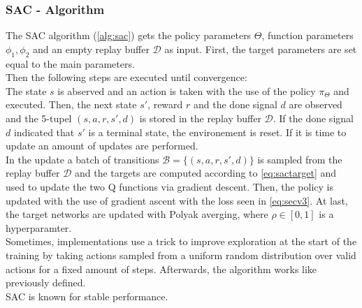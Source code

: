 \subsubsection{SAC - Algorithm}
The SAC algorithm (\cref{alg:sac}) gets the policy parameters $\Theta$, function parameters $\phi_1, \phi_2$ and an empty replay buffer $\mathcal{D}$ as input. First, the target parameters are set equal to the main parameters.\\
Then the following steps are executed until convergence:\\
The state $s$ is abserved and an action is taken with the use of the policy $\pi_{\Theta}$ and executed.
Then, the next state $s'$, reward $r$ and the done signal $d$ are observed and the 5-tupel $(s, a, r, s', d)$ is stored in the replay buffer $\mathcal{D}$. If the done signal $d$ indicated that $s'$ is a terminal state, the environement is reset.
If it is time to update an amount of updates are performed.\\
In the update a batch of transitions $\mathcal{B}= \{(s,a,r,s', d)\}$ is sampled from the replay buffer $\mathcal{D}$ and the targets are computed according to \cref{eq:sactarget} and used to update the two Q functions via gradient descent. Then, the policy is updated with the use of gradient ascent with the loss seen in \cref{eq:secv3}.
At last, the target networks are updated with Polyak averging, where $\rho \in [0,1]$ is a hyperparamter.\\
\newline
Sometimes, implementations use a trick to improve exploration at the start of the training by taking actions sampled from a uniform random distribution over valid actions for a fixed amount of steps. Afterwards, the algorithm works like previously defined.\\
SAC is known for stable performance.

